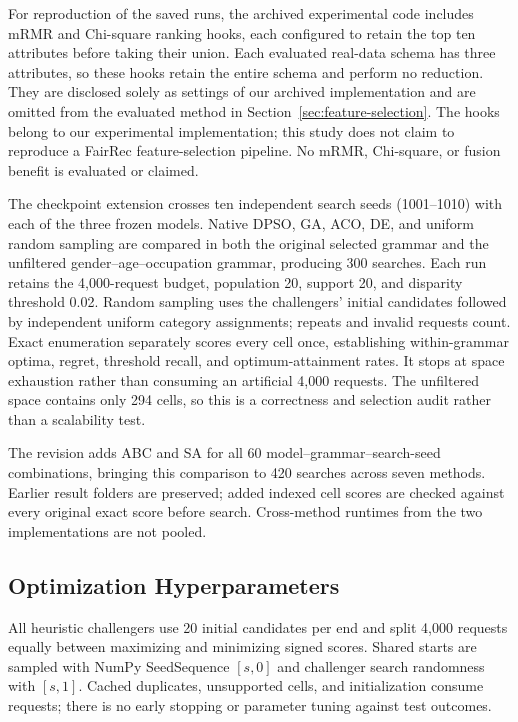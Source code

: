 For reproduction of the saved runs, the archived experimental code includes mRMR and Chi-square ranking hooks, each configured to retain the top ten attributes before taking their union. Each evaluated real-data schema has three attributes, so these hooks retain the entire schema and perform no reduction. They are disclosed solely as settings of our archived implementation and are omitted from the evaluated method in Section~\ref{sec:feature-selection}. The hooks belong to our experimental implementation; this study does not claim to reproduce a FairRec feature-selection pipeline. No mRMR, Chi-square, or fusion benefit is evaluated or claimed.

The checkpoint extension crosses ten independent search seeds (1001--1010) with each of the three frozen models. Native DPSO, GA, ACO, DE, and uniform random sampling are compared in both the original selected grammar and the unfiltered gender--age--occupation grammar, producing 300 searches. Each run retains the 4,000-request budget, population 20, support 20, and disparity threshold 0.02. Random sampling uses the challengers' initial candidates followed by independent uniform category assignments; repeats and invalid requests count. Exact enumeration separately scores every cell once, establishing within-grammar optima, regret, threshold recall, and optimum-attainment rates. It stops at space exhaustion rather than consuming an artificial 4,000 requests. The unfiltered space contains only 294 cells, so this is a correctness and selection audit rather than a scalability test.

The revision adds ABC and SA for all 60 model--grammar--search-seed combinations, bringing this comparison to 420 searches across seven methods. Earlier result folders are preserved; added indexed cell scores are checked against every original exact score before search. Cross-method runtimes from the two implementations are not pooled.

\subsection{Optimization Hyperparameters}
All heuristic challengers use 20 initial candidates per end and split 4,000 requests equally between maximizing and minimizing signed scores. Shared starts are sampled with NumPy SeedSequence $[s,0]$ and challenger search randomness with $[s,1]$. Cached duplicates, unsupported cells, and initialization consume requests; there is no early stopping or parameter tuning against test outcomes.

